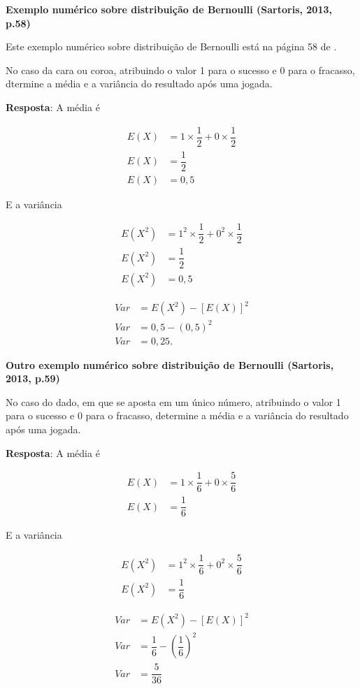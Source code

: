 \documentclass[
]{book}
\begin{document}
\textbf{Exemplo numérico sobre distribuição de Bernoulli (Sartoris, 2013, p.58)}

Este exemplo numérico sobre distribuição de Bernoulli está na página 58 de \citet{Sartoris2013}.

No caso da cara ou coroa, atribuindo o valor 1 para o sucesso e 0 para o fracasso, dtermine a média e a variância do resultado após uma jogada.

\textbf{Resposta}: A média é

\begin{align}
  E(X) &= 1 \times \dfrac{1}{2} + 0 \times \dfrac{1}{2}\\
  E(X) &= \dfrac{1}{2}\\
  E(X) &=0,5
\end{align}

E a variância

\begin{align}
  E(X^2) &= 1^2 \times \dfrac{1}{2} + 0^2 \times \dfrac{1}{2}\\
  E(X^2) &= \dfrac{1}{2}\\
  E(X^2) &= 0,5
\end{align}

\begin{align}
  Var &= E(X^2) - [E(X)]^2\\
  Var &= 0,5 - (0,5)^2\\
  Var &= 0,25.
\end{align}

\textbf{Outro exemplo numérico sobre distribuição de Bernoulli (Sartoris, 2013, p.59)}

No caso do dado, em que se aposta em um único número, atribuindo o valor 1 para o sucesso e 0 para o fracasso, determine a média e a variância do resultado após uma jogada.

\textbf{Resposta}: A média é

\begin{align}
  E(X) &= 1 \times \dfrac{1}{6} + 0 \times \dfrac{5}{6}\\
  E(X) &= \dfrac{1}{6}
\end{align}

E a variância

\begin{align}
  E(X^2) &= 1^2 \times \dfrac{1}{6} + 0^2 \times \dfrac{5}{6}\\
  E(X^2) &= \dfrac{1}{6}
\end{align}

\begin{align}
  Var &= E(X^2) - [E(X)]^2\\
  Var &= \dfrac{1}{6} - \left(\dfrac{1}{6}\right)^2\\
  Var &= \dfrac{5}{36}
\end{align}
\end{document}
